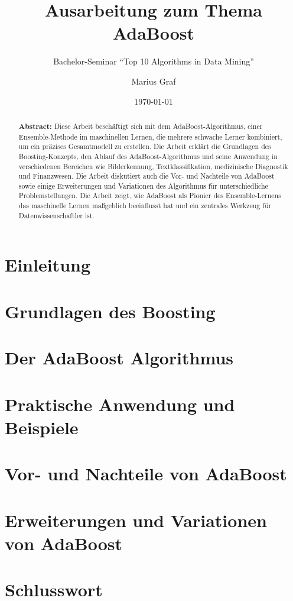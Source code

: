 \documentclass[11pt,a4paper,oneside]{scrartcl}
\begin{document}
\title{Ausarbeitung zum Thema AdaBoost}
\subtitle{Bachelor-Seminar "`Top 10 Algorithms in Data Mining"'}

\author{Marius Graf}
\date{\today}

\maketitle

\tableofcontents

\begin{abstract}
    \noindent\textbf{Abstract:}
    Diese Arbeit beschäftigt sich mit dem AdaBoost-Algorithmus, einer Ensemble-Methode im maschinellen
    Lernen, die mehrere schwache Lerner kombiniert, um ein präzises Gesamtmodell zu erstellen. Die Arbeit
    erklärt die Grundlagen des Boosting-Konzepts, den Ablauf des AdaBoost-Algorithmus und seine Anwendung in
    verschiedenen Bereichen wie Bilderkennung, Textklassifikation, medizinische Diagnostik und Finanzwesen.
    Die Arbeit diskutiert auch die Vor- und Nachteile von AdaBoost sowie einige Erweiterungen und Variationen
    des Algorithmus für unterschiedliche Problemstellungen. Die Arbeit zeigt, wie AdaBoost als Pionier des
    Ensemble-Lernens das maschinelle Lernen maßgeblich beeinflusst hat und ein zentrales Werkzeug für Datenwissenschaftler ist.
\end{abstract}
\newpage

\section{Einleitung}


\section{Grundlagen des Boosting}


\section{Der AdaBoost Algorithmus}


\section{Praktische Anwendung und Beispiele}


\section{Vor- und Nachteile von AdaBoost}


\section{Erweiterungen und Variationen von AdaBoost}



\section{Schlusswort}




\end{document}
